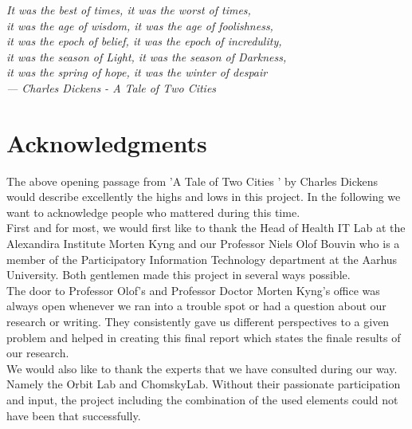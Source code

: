 
\begin{flushright}{\slshape    
	It was the best of times, it was the worst of times,\\
	it was the age of wisdom, it was the age of foolishness,\\ 
	it was the epoch of belief, it was the epoch of incredulity,\\ 
	it was the season of Light, it was the season of Darkness,\\
	it was the spring of hope, it was the winter of despair\\ \medskip
    --- Charles Dickens - A Tale of Two Cities \cite{dickens}}
\end{flushright}



\bigskip

\begingroup
\let\clearpage\relax
\let\cleardoublepage\relax
\let\cleardoublepage\relax
\chapter*{Acknowledgments}

The above opening passage from 'A Tale of Two  Cities ' by Charles Dickens would describe excellently the highs and lows in this project. In the following we want to acknowledge people who mattered during this time.\\


First and for most, we would first like to thank the Head of Health IT Lab at the Alexandira Institute Morten Kyng and our Professor Niels Olof Bouvin who is a member of the Participatory Information Technology department at the Aarhus University. Both gentlemen made this project in several ways possible.\\


The door to Professor Olof's and Professor Doctor Morten Kyng's office was always open whenever we ran into a trouble spot or had a question about our research or writing. They consistently gave us different perspectives to a given problem and helped in creating this final report which states the finale results of our research.\\


We would also like to thank the experts that we have consulted during our way. Namely the Orbit Lab and ChomskyLab. Without their passionate participation and input, the project including the combination of the used elements could not have been that successfully.\\
\endgroup



